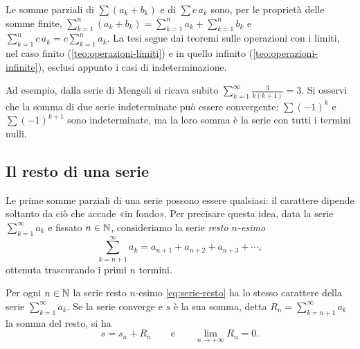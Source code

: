 \begin{dimostrazione}
Le somme parziali di $\sum(a_{k}+b_{k})$ e di $\sum c\,a_{k}$ sono, per le proprietà delle
somme finite, $\sum_{k=1}^{n}(a_{k}+b_{k})=\sum_{k=1}^{n}a_{k}+\sum_{k=1}^{n}b_{k}$ e
$\sum_{k=1}^{n}c\,a_{k}=c\sum_{k=1}^{n}a_{k}$. La tesi segue dai teoremi sulle operazioni con i
limiti, nel caso finito (\cref{teo:operazioni-limiti}) e in quello infinito
(\cref{teo:operazioni-infinite}), esclusi appunto i casi di indeterminazione.
\end{dimostrazione}

Ad esempio, dalla serie di Mengoli si ricava subito
$\sum_{k=1}^{\infty}\frac3{k(k+1)}=3$. Si osservi che la somma di due serie indeterminate può
essere convergente: $\sum(-1)^{k}$ e $\sum(-1)^{k+1}$ sono indeterminate, ma la loro somma è la
serie con tutti i termini nulli.

\subsection{Il resto di una serie}

Le prime somme parziali di una serie possono essere qualsiasi: il carattere dipende
soltanto da ciò che accade «in fondo». Per precisare questa idea, data la serie
$\sum_{k=1}^{\infty}a_{k}$ e fissato $n\in\mathbb{N}$, consideriamo la serie \emph{resto $n$-esimo}
\begin{equation}\label{eq:serie-resto}
  \sum_{k=n+1}^{\infty}a_{k}=a_{n+1}+a_{n+2}+a_{n+3}+\cdots ,
\end{equation}
ottenuta trascurando i primi $n$ termini.

\begin{teorema}\label{teo:resto-serie}
Per ogni $n\in\mathbb{N}$ la serie resto $n$-esimo \eqref{eq:serie-resto} ha lo stesso carattere
della serie $\sum_{k=1}^{\infty}a_{k}$. Se la serie converge e $s$ è la sua somma, detta
$R_{n}=\sum_{k=n+1}^{\infty}a_{k}$ la somma del resto, si ha
\begin{equation}\label{eq:resto-serie}
  s=s_{n}+R_{n} \qquad\text{e}\qquad \lim_{n\to+\infty}R_{n}=0 .
\end{equation}
\end{teorema}

\begin{schema}
\end{schema}


